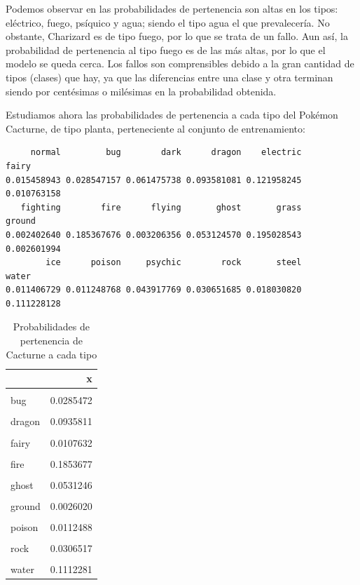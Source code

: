 \documentclass[
  12pt,
]{extreport}
\begin{document}
Podemos observar en las probabilidades de pertenencia son altas en los
tipos: eléctrico, fuego, psíquico y agua; siendo el tipo agua el que
prevalecería. No obstante, Charizard es de tipo fuego, por lo que se
trata de un fallo. Aun así, la probabilidad de pertenencia al tipo fuego
es de las más altas, por lo que el modelo se queda cerca. Los fallos son
comprensibles debido a la gran cantidad de tipos (clases) que hay, ya
que las diferencias entre una clase y otra terminan siendo por
centésimas o milésimas en la probabilidad obtenida.

Estudiamos ahora las probabilidades de pertenencia a cada tipo del
Pokémon Cacturne, de tipo planta, perteneciente al conjunto de
entrenamiento:

\begin{verbatim}
     normal         bug        dark      dragon    electric       fairy 
0.015458943 0.028547157 0.061475738 0.093581081 0.121958245 0.010763158 
   fighting        fire      flying       ghost       grass      ground 
0.002402640 0.185367676 0.003206356 0.053124570 0.195028543 0.002601994 
        ice      poison     psychic        rock       steel       water 
0.011406729 0.011248768 0.043917769 0.030651685 0.018030820 0.111228128 
\end{verbatim}

\begin{table}[H]
\centering
\caption{Probabilidades de pertenencia de Cacturne a cada tipo}
\centering
\fontsize{9}{11}\selectfont
\begin{tabular}[t]{lr}
\toprule
  & x\\
\midrule
\cellcolor{gray!10}{normal} & \cellcolor{gray!10}{0.0154589}\\
bug & 0.0285472\\
\cellcolor{gray!10}{dark} & \cellcolor{gray!10}{0.0614757}\\
dragon & 0.0935811\\
\cellcolor{gray!10}{electric} & \cellcolor{gray!10}{0.1219582}\\
\addlinespace
fairy & 0.0107632\\
\cellcolor{gray!10}{fighting} & \cellcolor{gray!10}{0.0024026}\\
fire & 0.1853677\\
\cellcolor{gray!10}{flying} & \cellcolor{gray!10}{0.0032064}\\
ghost & 0.0531246\\
\addlinespace
\cellcolor{gray!10}{grass} & \cellcolor{gray!10}{0.1950285}\\
ground & 0.0026020\\
\cellcolor{gray!10}{ice} & \cellcolor{gray!10}{0.0114067}\\
poison & 0.0112488\\
\cellcolor{gray!10}{psychic} & \cellcolor{gray!10}{0.0439178}\\
\addlinespace
rock & 0.0306517\\
\cellcolor{gray!10}{steel} & \cellcolor{gray!10}{0.0180308}\\
water & 0.1112281\\
\bottomrule
\end{tabular}
\end{table}
\end{document}
